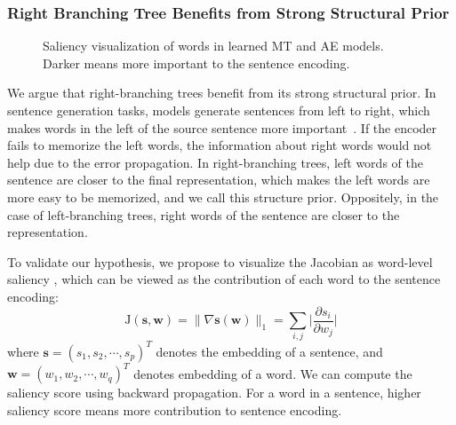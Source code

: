 \documentclass[11pt,a4paper]{article}
\begin{document}
\subsubsection{Right Branching Tree Benefits from Strong Structural Prior}
\label{sec:right-better}
\begin{figure*}[t]
    \centering
    
    \caption{\label{fig:saliency} Saliency visualization of words in learned MT and AE models. Darker means more important to the sentence encoding. }
\end{figure*}

We argue that right-branching trees benefit from its strong structural prior.
In sentence generation tasks, models generate sentences from left to right, which makes words in the left of the source sentence more important~\cite{sutskever2014sequence}.
If the encoder fails to memorize the left words, the information about right words would not help due to the error propagation.
In right-branching trees, left words of the sentence are closer to the final representation, which makes the left words are more easy to  be memorized, and we call this structure prior.
Oppositely, in the case of  left-branching trees, right words of the sentence are closer to the representation.

To validate our hypothesis, we propose to visualize the Jacobian as word-level saliency \cite{shi2018learning}, which can be viewed as the contribution of each word to the sentence encoding: 
\begin{equation*}
    \mathrm{J}(\mathbf{s}, \mathbf{w}) = \lVert\nabla \mathbf{s}(\mathbf{w})\rVert_1 = \sum_{i,j} \vert\frac{\partial s_i}{\partial w_j}\vert 
\end{equation*}
where $\mathbf{s}=(s_1, s_2, \cdots, s_p)^T$ denotes the embedding of a sentence, and $\mathbf{w}=(w_1, w_2, \cdots, w_q)^T$ denotes embedding of a word.
We can compute the saliency score using backward propagation.
For a word in a sentence, higher saliency score means more contribution to  sentence encoding. 
\end{document}
